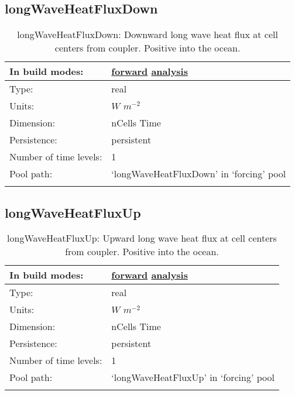 \subsection[longWaveHeatFluxDown]{longWaveHeatFluxDown}
\label{subsec:var_sec_forcing_longWaveHeatFluxDown}
\begin{center}
\begin{longtable}{| p{2.0in} | p{4.0in} |}
        \hline 
        In build modes: & \hyperref[subsec:forward_var_tab_forcing]{forward} \hyperref[subsec:analysis_var_tab_forcing]{analysis} \\
        \hline 
        Type: & real \\
        \hline 
        Units: & $W$ $m^{-2}$ \\
        \hline 
        Dimension: & nCells Time \\
        \hline 
        Persistence: & persistent \\
        \hline 
        Number of time levels: & 1 \\
        \hline 
            Pool path: & `longWaveHeatFluxDown' in `forcing' pool \\
		 \hline 
    \caption{longWaveHeatFluxDown: Downward long wave heat flux at cell centers from coupler. Positive into the ocean.}
\end{longtable}
\end{center}
\subsection[longWaveHeatFluxUp]{longWaveHeatFluxUp}
\label{subsec:var_sec_forcing_longWaveHeatFluxUp}
\begin{center}
\begin{longtable}{| p{2.0in} | p{4.0in} |}
        \hline 
        In build modes: & \hyperref[subsec:forward_var_tab_forcing]{forward} \hyperref[subsec:analysis_var_tab_forcing]{analysis} \\
        \hline 
        Type: & real \\
        \hline 
        Units: & $W$ $m^{-2}$ \\
        \hline 
        Dimension: & nCells Time \\
        \hline 
        Persistence: & persistent \\
        \hline 
        Number of time levels: & 1 \\
        \hline 
            Pool path: & `longWaveHeatFluxUp' in `forcing' pool \\
		 \hline 
    \caption{longWaveHeatFluxUp: Upward long wave heat flux at cell centers from coupler. Positive into the ocean.}
\end{longtable}
\end{center}
